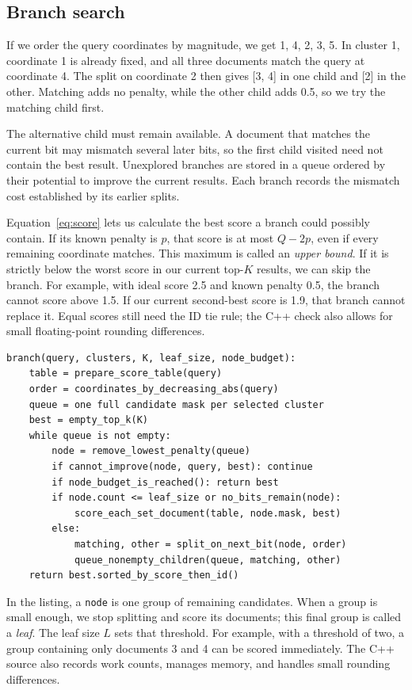 \subsection{Branch search}
If we order the query coordinates by magnitude, we get 1, 4, 2, 3, 5. In cluster 1,
coordinate 1 is already fixed, and all three documents match the query at coordinate 4.
The split on coordinate 2 then gives [3, 4] in one child and [2] in the other. Matching adds
no penalty, while the other child adds 0.5, so we try the matching child first.

The alternative child must remain available. A document that matches the current bit may
mismatch several later bits, so the first child visited need not contain the best result.
Unexplored branches are stored in a queue ordered by their potential to improve the current
results. Each branch records the mismatch cost established by its earlier splits.

Equation~\ref{eq:score} lets us calculate the best score a branch could possibly contain.
If its known penalty is $p$, that score is at most $Q-2p$, even if every remaining coordinate
matches. This maximum is called an \emph{upper bound}. If it is strictly below the worst
score in our current top-$K$ results, we can skip the branch. For example, with ideal score
2.5 and known penalty 0.5, the branch cannot score above 1.5. If our current second-best score
is 1.9, that branch cannot replace it. Equal scores still need the ID tie rule; the C++ check
also allows for small floating-point rounding differences.


\begin{lstlisting}[caption={Bitplane search. The queue preserves alternatives to the preferred path.}]
branch(query, clusters, K, leaf_size, node_budget):
    table = prepare_score_table(query)
    order = coordinates_by_decreasing_abs(query)
    queue = one full candidate mask per selected cluster
    best = empty_top_k(K)
    while queue is not empty:
        node = remove_lowest_penalty(queue)
        if cannot_improve(node, query, best): continue
        if node_budget_is_reached(): return best
        if node.count <= leaf_size or no_bits_remain(node):
            score_each_set_document(table, node.mask, best)
        else:
            matching, other = split_on_next_bit(node, order)
            queue_nonempty_children(queue, matching, other)
    return best.sorted_by_score_then_id()
\end{lstlisting}

In the listing, a \texttt{node} is one group of remaining candidates. When a group is small
enough, we stop splitting and score its documents; this final group is called a \emph{leaf}.
The leaf size $L$ sets that threshold. For example, with a threshold of two, a group containing
only documents 3 and 4 can be scored immediately. The C++ source also records work counts,
manages memory, and handles small rounding differences.

